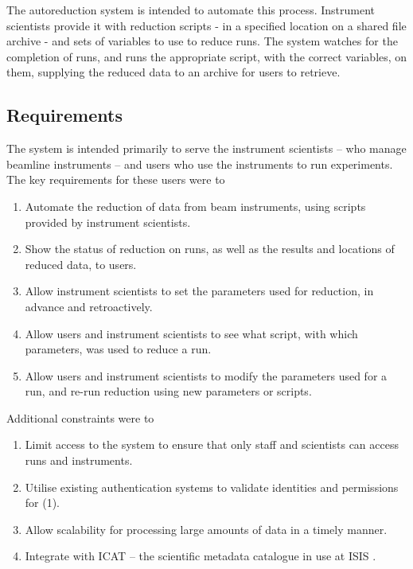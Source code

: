 \documentclass[twocolumn]{article}
\begin{document}
The autoreduction system is intended to automate this process.
Instrument scientists provide it with reduction scripts - in a specified
location on a shared file archive - and sets of variables to use to
reduce runs. The system watches for the completion of runs, and runs the
appropriate script, with the correct variables, on them, supplying the
reduced data to an archive for users to retrieve.

\subsection{Requirements}\label{requirements}

The system is intended primarily to serve the instrument scientists --
who manage beamline instruments -- and users who use the instruments to
run experiments. The key requirements for these users were to

\begin{enumerate}
\item
  Automate the reduction of data from beam instruments, using scripts
  provided by instrument scientists.
\item
  Show the status of reduction on runs, as well as the results and
  locations of reduced data, to users.
\item
  Allow instrument scientists to set the parameters used for reduction,
  in advance and retroactively.
\item
  Allow users and instrument scientists to see what script, with which
  parameters, was used to reduce a run.
\item
  Allow users and instrument scientists to modify the parameters used
  for a run, and re-run reduction using new parameters or scripts.
\end{enumerate}

Additional constraints were to

\begin{enumerate}
\item
  Limit access to the system to ensure that only staff and scientists
  can access runs and instruments.
\item
  Utilise existing authentication systems to validate identities and
  permissions for (1).
\item
  Allow scalability for processing large amounts of data in a timely
  manner.
\item
  Integrate with ICAT \cite{icat} -- the scientific metadata catalogue in use
  at ISIS .
\end{enumerate}
\end{document}
